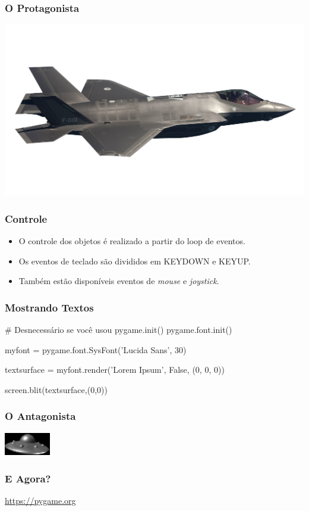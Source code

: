 \begin{frame}
    \frametitle{O Protagonista}

    \centering
    \includegraphics[height=0.7\paperheight]{../code/media/images/f18-big.png}
\end{frame}

\begin{frame}
    \frametitle{Controle}

    \begin{itemize}
        \item O controle dos objetos é realizado a partir do loop de eventos.
        \item Os eventos de teclado são divididos em KEYDOWN e KEYUP.
        \item Também estão disponíveis eventos de \textit{mouse} e
        \textit{joystick}.
    \end{itemize}
\end{frame}

\begin{frame}[fragile]
    \frametitle{Mostrando Textos}
    \begin{python}
        # Desnecessário se você usou pygame.init()
        pygame.font.init()

        myfont = pygame.font.SysFont('Lucida Sans', 30)

        textsurface = myfont.render('Lorem Ipsum', False, (0, 0, 0))

        screen.blit(textsurface,(0,0))
    \end{python}
\end{frame}

\begin{frame}
    \frametitle{O Antagonista}

    \centering
    \includegraphics[height=1cm]{../code/media/images/ufo_spin-7.jpg}
\end{frame}

\begin{frame}
    \frametitle{E Agora?}
    \centering
    \Huge\url{https://pygame.org}
\end{frame}



